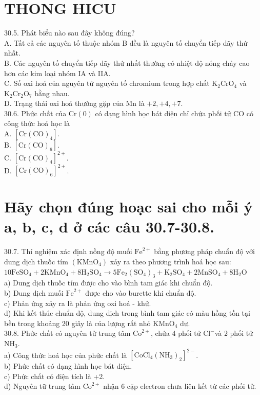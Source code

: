 \documentclass[10pt]{article}
\begin{document}
\section*{THONG HICU}
30.5. Phát biểu nào sau đây không đúng?\\
A. Tất cả các nguyên tố thuộc nhóm B đều là nguyên tố chuyển tiếp dãy thứ nhất.\\
B. Các nguyên tố chuyển tiếp dãy thứ nhất thường có nhiệt độ nóng chảy cao hơn các kim loại nhóm IA và IIA.\\
C. Số oxi hoá của nguyên tử nguyên tố chromium trong hợp chất $\mathrm{K}_{2} \mathrm{CrO}_{4}$ và $\mathrm{K}_{2} \mathrm{Cr}_{2} \mathrm{O}_{7}$ bằng nhau.\\
D. Trạng thái oxi hoá thường gặp của Mn là $+2,+4,+7$.\\
30.6. Phức chất của $\mathrm{Cr}(0)$ có dạng hình học bát diện chỉ chứa phối tử CO có công thức hoá học là\\
A. $\left[\mathrm{Cr}(\mathrm{CO})_{4}\right]$.\\
B. $\left[\mathrm{Cr}(\mathrm{CO})_{6}\right]$.\\
C. $\left[\mathrm{Cr}(\mathrm{CO})_{4}\right]^{2+}$.\\
D. $\left[\mathrm{Cr}(\mathrm{CO})_{6}\right]^{2+}$.

\section*{Hãy chọn đúng hoạc sai cho mỗi ý a, b, c, d ở các câu 30.7-30.8.}
30.7. Thí nghiệm xác định nồng độ muối $\mathrm{Fe}^{2+}$ bằng phương pháp chuẩn độ với dung dịch thuốc tím $\left(\mathrm{KMnO}_{4}\right)$ xảy ra theo phương trình hoá học sau:\\
$10 \mathrm{FeSO}_{4}+2 \mathrm{KMnO}_{4}+8 \mathrm{H}_{2} \mathrm{SO}_{4} \longrightarrow 5 \mathrm{Fe}_{2}\left(\mathrm{SO}_{4}\right)_{3}+\mathrm{K}_{2} \mathrm{SO}_{4}+2 \mathrm{MnSO}_{4}+8 \mathrm{H}_{2} \mathrm{O}$\\
a) Dung dịch thuốc tím được cho vào bình tam giác khi chuẩn độ.\\
b) Dung dịch muối $\mathrm{Fe}^{2+}$ được cho vào burette khi chuẩn độ.\\
c) Phản ứng xảy ra là phản ứng oxi hoá - khử.\\
d) Khi kết thúc chuẩn độ, dung dịch trong bình tam giác có màu hồng tồn tại bền trong khoảng 20 giây là của lượng rất nhỏ $\mathrm{KMnO}_{4}$ dư.\\
30.8. Phức chất có nguyên tử trung tâm $\mathrm{Co}^{2+}$, chứa 4 phối tử $\mathrm{Cl}^{-}$và 2 phối tử $\mathrm{NH}_{3}$.\\
a) Công thức hoá học của phức chất là $\left[\mathrm{CoCl}_{4}\left(\mathrm{NH}_{3}\right)_{2}\right]^{2-}$.\\
b) Phức chất có dạng hình học bát diện.\\
c) Phức chất có điện tích là +2.\\
d) Nguyên tữ trung tâm $\mathrm{Co}^{2+}$ nhận 6 cặp electron chưa liên kết từ các phối tử.
\end{document}
